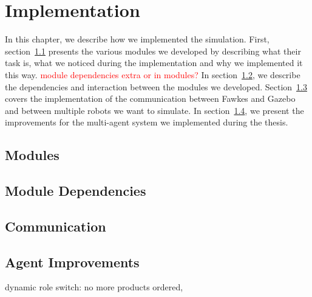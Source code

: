 \chapter{Implementation}
\label{cha:implementation}
In this chapter, we describe how we implemented the simulation. First, section~\ref{sec:modules} presents the various modules we developed by describing what their task is, what we noticed during the implementation and why we implemented it this way. \textcolor{red}{module dependencies extra or in modules?} In section~\ref{sec:module_dependencies}, we describe the dependencies and interaction between the modules we developed. Section~\ref{sec:imp_communication} covers the implementation of the communication between Fawkes and Gazebo and between multiple robots we want to simulate. In section~\ref{sec:agent_improvements}, we present the improvements for the multi-agent system we implemented during the thesis.

\section{Modules}
\label{sec:modules}

\section{Module Dependencies}
\label{sec:module_dependencies}

\section{Communication}
\label{sec:imp_communication}

\section{Agent Improvements}
\label{sec:agent_improvements}
dynamic role switch: no more products ordered, \cite{dynamic_role_assignment}
